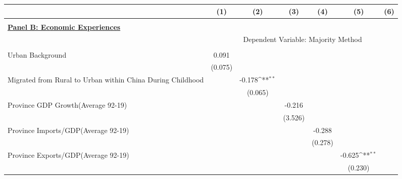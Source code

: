 \documentclass[]{article}
\begin{document}
\begin{table}
\begin{adjustbox}{width=\columnwidth,center}

{
\def\sym#1{\ifmmode^{#1}\else\(^{#1}\)\fi}
\begin{tabular}{l*{6}{c}}
\hline\hline
                &\multicolumn{1}{c}{(1)}         &\multicolumn{1}{c}{(2)}         &\multicolumn{1}{c}{(3)}         &\multicolumn{1}{c}{(4)}         &\multicolumn{1}{c}{(5)}         &\multicolumn{1}{c}{(6)}         \\
\hline \\ \textbf{\underline {Panel B: Economic Experiences}}&&&&&& \\ & \multicolumn{6}{c}{Dependent Variable: Majority Method} \\ \cmidrule(lr){2-7} \\
Urban Background&    0.091         &                  &                  &                  &                  &                  \\
                &  (0.075)         &                  &                  &                  &                  &                  \\
[1em]
Migrated from Rural to Urban within China During Childhood&                  &   -0.178\sym{**} &                  &                  &                  &                  \\
                &                  &  (0.065)         &                  &                  &                  &                  \\
[1em]
Province GDP Growth(Average 92-19)&                  &                  &   -0.216         &                  &                  &                  \\
                &                  &                  &  (3.526)         &                  &                  &                  \\
[1em]
Province Imports/GDP(Average 92-19)&                  &                  &                  &   -0.288         &                  &                  \\
                &                  &                  &                  &  (0.278)         &                  &                  \\
[1em]
Province Exports/GDP(Average 92-19)&                  &                  &                  &                  &   -0.625\sym{**} &                  \\
                &                  &                  &                  &                  &  (0.230)         &                  \\

\end{tabular}}
\end{adjustbox}
\end{table}
\end{document}
